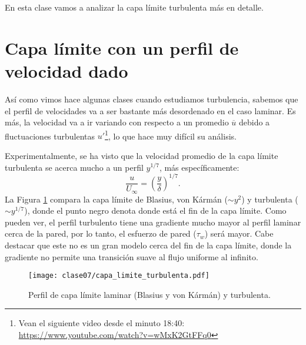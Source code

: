 En esta clase vamos a analizar la capa límite turbulenta más en detalle.

\section*{Capa límite con un perfil de velocidad dado}

Así como vimos hace algunas clases cuando estudiamos turbulencia, sabemos que el perfil de velocidades va a ser bastante más desordenado en el caso laminar.
Es más, la velocidad va a ir variando con respecto a un promedio $\overline{u}$ debido a fluctuaciones turbulentas $u'$\footnote{Vean el siguiente video desde el minuto 18:40: \url{https://www.youtube.com/watch?v=wMxK2GtFFq0}}, lo que hace muy difícil su análisis.

Experimentalmente, se ha visto que la velocidad promedio de la capa límite turbulenta se acerca mucho a un perfil $y^{1/7}$, más específicamente:
%
\begin{equation}\label{eq:perfil_turbulento}
\frac{u}{U_\infty} = \left(\frac{y}{\delta}\right)^{1/7}.
\end{equation}
%
La Figura \ref{fig:capa_limite_turbulenta} compara la capa límite de Blasius, von Kármán ($\sim y^2$) y turbulenta ($\sim y^{1/7}$), donde el punto negro denota donde está el fin de la capa límite. Como pueden ver, el perfil turbulento tiene una gradiente mucho mayor al perfil laminar cerca de la pared, por lo tanto, el esfuerzo de pared ($\tau_w$) será mayor.
Cabe destacar que este no es un gran modelo cerca del fin de la capa límite, donde la gradiente no permite una transición suave al flujo uniforme al infinito.
%
\begin{figure}
\centering
\texttt{[image: clase07/capa\_limite\_turbulenta.pdf]}
\caption{Perfil de capa límite laminar (Blasius y von Kármán) y turbulenta.}
\label{fig:capa_limite_turbulenta}
\end{figure}

